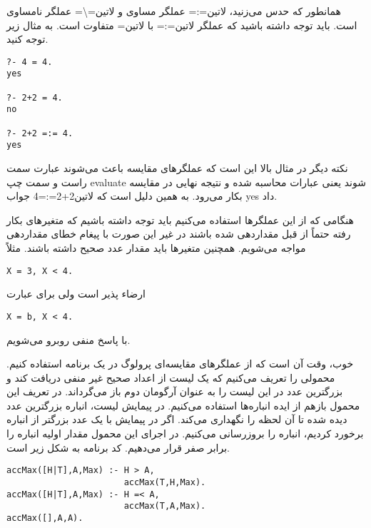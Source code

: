 همانطور که حدس می‌زنید، ‌لاتین{=:=} عملگر مساوی و ‌لاتین{=\textbackslash=} عملگر نامساوی است. باید توجه داشته باشید که عملگر ‌لاتین{=:=} با ‌لاتین{=} متفاوت است. به مثال زیر توجه کنید.

\begin{latin}
\begin{lstlisting}
?- 4 = 4.
yes

?- 2+2 = 4.
no

?- 2+2 =:= 4.
yes
\end{lstlisting}
\end{latin}

نکته دیگر در مثال بالا این است که عملگرهای مقایسه باعث می‌شوند عبارت سمت راست و سمت چپ evaluate شوند یعنی عبارات محاسبه شده و نتیجه نهایی در مقایسه بکار می‌رود. به همین دلیل است که ‌لاتین{2+2=:=4} جواب yes داد.

هنگامی که از این عملگرها استفاده می‌کنیم باید توجه داشته باشیم که متغیرهای بکار رفته حتماً از قبل مقداردهی شده باشند در غیر این صورت با پیغام خطای مقداردهی مواجه می‌شویم. همچنین متغیرها باید مقدار عدد صحیح داشته باشند. مثلاً 
\begin{latin}
\begin{lstlisting}
X = 3, X < 4.
\end{lstlisting}
\end{latin}

ارضاء پذیر است ولی برای عبارت

\begin{latin}
\begin{lstlisting}
X = b, X < 4.
\end{lstlisting}
\end{latin}

با پاسخ منفی روبرو می‌شویم.

خوب، وقت آن است که از عملگرهای مقایسه‌ای پرولوگ در یک برنامه استفاده کنیم. محمولی را تعریف می‌کنیم که یک لیست از اعداد صحیح غیر منفی دریافت کند و بزرگترین عدد در این لیست را به عنوان آرگومان دوم باز می‌گرداند. در تعریف این محمول بازهم از ایده انباره‌ها استفاده می‌کنیم. در پیمایش لیست، انباره بزرگترین عدد دیده شده تا آن لحظه را نگهداری می‌کند. اگر در پیمایش با یک عدد بزرگتر از انباره برخورد کردیم، انباره را بروزرسانی می‌کنیم. در اجرای این محمول مقدار اولیه انباره را برابر صفر قرار می‌دهیم. کد برنامه به شکل زیر است.

\begin{latin}
\begin{lstlisting}
accMax([H|T],A,Max) :- H > A,
                       accMax(T,H,Max).
accMax([H|T],A,Max) :- H =< A,
                       accMax(T,A,Max).
accMax([],A,A).
\end{lstlisting}
\end{latin}

